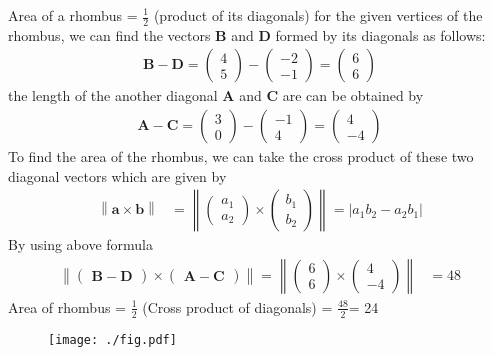 \documentclass[12pt]{article}
\providecommand{\norm}[1]{\left\lVert#1\right\rVert}
\newcommand{\myvec}[1]{\ensuremath{\begin{pmatrix}#1\end{pmatrix}}}
\let\vec\mathbf
\begin{document}
\begin{enumerate}
Area of a rhombus  = $\frac{1}{2}$ (product of its diagonals)
for the given vertices of the rhombus, we can find the vectors $\vec{B}$ and $\vec{D}$ formed by its diagonals as follows:
\begin{align}
 \vec{B-D}= \myvec{4 \\ 5} - \myvec{-2 \\-1}= \myvec{6\\6}
\end{align}
the length of the another diagonal $\vec{A}$ and $\vec{C}$ are can be obtained by
\begin{align}
  \vec{A-C}= \myvec{3 \\ 0} - \myvec{-1 \\4}= \myvec{4\\-4}
\end{align}
To find the area of the rhombus, we can take the cross product of these two diagonal vectors which are given by
\begin{align}
    \norm{\vec{a}\times \vec{b}} &=\norm{\myvec{a_1\\a_2} \times \myvec{b_1\\b_2}} =  \lvert a_1 b_2 - a_2 b_1 \rvert  
\end{align}
By using above formula
\begin{align}
        \norm{\myvec{\vec{B-D}}\times \myvec{\vec{A-C}}} = \norm{\myvec{6\\6} \times \myvec{4\\-4}} &= 48 
\end{align}
Area of rhombus = $\frac{1}{2}$ (Cross product of diagonals)
                = $\frac{48}{2}$= 24
\begin{figure}[!h]
 \begin{center}
  \texttt{[image: ./fig.pdf]}
 \end{center}
\caption{}
\label{fig:Fig1}
\end{figure}
\end{enumerate}
\end{document}
